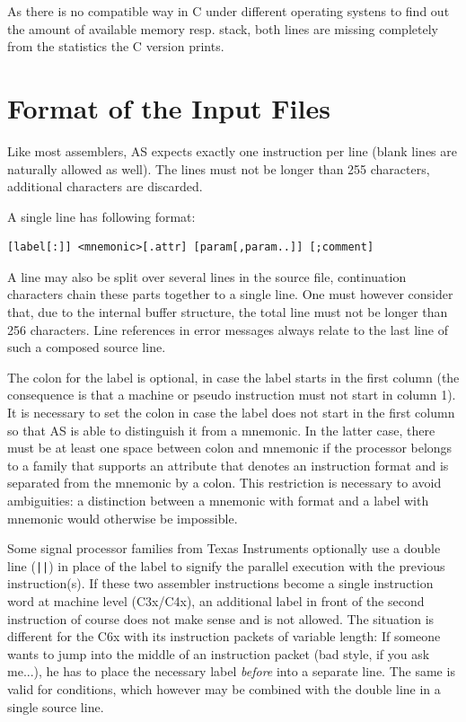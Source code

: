 \documentclass[12pt,twoside]{report}
\newcommand{\asname}{{AS}}
\begin{document}
As there is no compatible way in C  under different
operating systens to find out the amount of available memory resp. stack,
both lines are missing completely from the statistics the C version prints.


\section{Format of the Input Files}
\label{AttrTypes}

Like most assemblers, \asname{} expects exactly one instruction per line
(blank lines are naturally allowed as well).  The lines must not be
longer than 255 characters, additional characters are discarded.

A single line has following format:
\begin{verbatim}
[label[:]] <mnemonic>[.attr] [param[,param..]] [;comment]
\end{verbatim}
A line may also be split over several lines in the source file,
continuation characters chain these parts together to a single line.  One
must however consider that, due to the internal buffer structure, the
total line must not be longer than 256 characters.  Line references in
error messages always relate to the last line of such a composed source
line.
\par
The colon for the label is optional, in case the label starts in the
first column (the consequence is that a machine or pseudo
instruction must not start in column 1).  It is necessary to set the
colon in case the label does not start in the first column so that \asname{}
is able to distinguish it from a mnemonic.  In the latter case, there
must be at least one space between colon and mnemonic if the processor
belongs to a family that supports an attribute that denotes an
instruction format and is separated from the mnemonic by a colon.  This
restriction is necessary to avoid ambiguities: a distinction between a
mnemonic with format and a label with mnemonic would otherwise be
impossible.

Some signal processor families from Texas Instruments optionally use
a double line (\verb!||!) in place of the label to signify the
parallel execution with the previous instruction(s).  If these two
assembler instructions become a single instruction word at machine
level (C3x/C4x), an additional label in front of the second
instruction of course does not make sense and is not allowed.  The
situation is different for the C6x with its instruction packets of
variable length: If someone wants to jump into the middle of an
instruction packet (bad style, if you ask me...), he has to place the
necessary label {\em before} into a separate line.  The same is valid
for conditions, which however may be combined with the double line in
a single source line.
\end{document}
